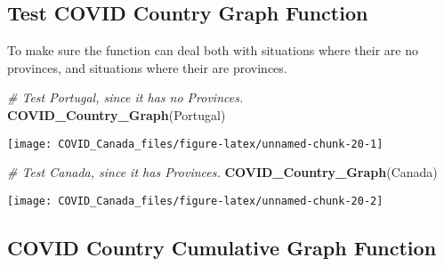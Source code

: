 \documentclass[]{tufte-handout}
\newenvironment{Shaded}{}{}
\newcommand{\CommentTok}[1]{\textcolor[rgb]{0.38,0.63,0.69}{\textit{#1}}}
\newcommand{\KeywordTok}[1]{\textcolor[rgb]{0.00,0.44,0.13}{\textbf{#1}}}
\newcommand{\NormalTok}[1]{#1}
\begin{document}
\hypertarget{test-covid-country-graph-function}{%
\subsection{Test COVID Country Graph
Function}\label{test-covid-country-graph-function}}

To make sure the function can deal both with situations where their are
no provinces, and situations where their are provinces.

\begin{Shaded}
\begin{Highlighting}[]
\CommentTok{# Test Portugal, since it has no Provinces.}
\KeywordTok{COVID_Country_Graph}\NormalTok{(Portugal)}
\end{Highlighting}
\end{Shaded}

\texttt{[image: COVID\_Canada\_files/figure-latex/unnamed-chunk-20-1]}

\begin{Shaded}
\begin{Highlighting}[]
\CommentTok{# Test Canada, since it has Provinces.}
\KeywordTok{COVID_Country_Graph}\NormalTok{(Canada)}
\end{Highlighting}
\end{Shaded}

\texttt{[image: COVID\_Canada\_files/figure-latex/unnamed-chunk-20-2]}

\hypertarget{covid-country-cumulative-graph-function}{%
\subsection{COVID Country Cumulative Graph
Function}\label{covid-country-cumulative-graph-function}}
\end{document}
